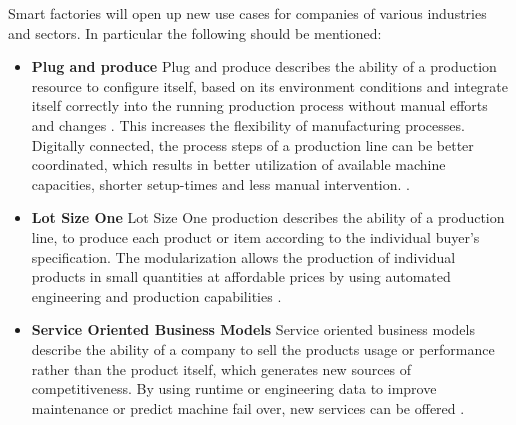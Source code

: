Smart factories will open up new use cases for companies of various industries and sectors. In particular the following should be mentioned:
\begin{itemize}
    \item[] \textbf{Plug and produce} Plug and produce describes the ability of a production resource to configure itself, based on its environment conditions and integrate itself correctly into the running production process without manual efforts and changes \cite[p. 146]{Ye20204.0}. This increases the flexibility of manufacturing processes. Digitally connected, the process steps of a production line can be better coordinated, which results in better utilization of available machine capacities, shorter setup-times and less manual intervention. \cite[p. 16]{Acatech2013Recommendations4.0}. 
    \item[] \textbf{Lot Size One} Lot Size One production describes the ability of a production line, to produce each product or item according to the individual buyer's specification. The modularization allows the production of individual products in small quantities at affordable prices by using automated engineering and production capabilities \cite[p. 15]{Acatech2013Recommendations4.0}.
    \item[] \textbf{Service Oriented Business Models} Service oriented business models describe the ability of a company to sell the products usage or performance rather than the product itself, which generates new sources of competitiveness. By using runtime or engineering data to improve maintenance or predict machine fail over, new services can be offered \cite{Bendig2021Equipment-as-a-ServiceIndustry}.
\end{itemize}

